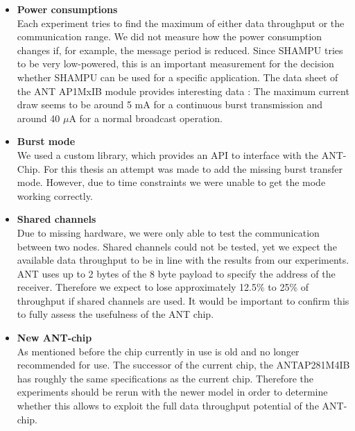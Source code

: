 \begin{itemize}
	\item{\textbf{Power consumptions}} \hfill \\ Each experiment tries to find the maximum of either data throughput or the communication range. We did not measure how the power consumption changes if, for example, the message period is reduced. Since SHAMPU tries to be very low-powered, this is an important measurement for the decision whether SHAMPU can be used for a specific application. The data sheet of the ANT AP1MxIB module provides interesting data \cite{Networks}: The maximum current draw seems to be around 5 mA for a continuous burst transmission and around 40 $\mu$A for a normal broadcast operation.
	
	\item{\textbf{Burst mode}} \hfill \\ We used a custom library, which provides an API to interface with the ANT-Chip. For this thesis an attempt was made to add the missing burst transfer mode. However, due to time constraints we were unable to get the mode working correctly. 
	
	\item{\textbf{Shared channels}} \hfill \\ Due to missing hardware, we were only able to test the communication between two nodes. Shared channels could not be tested, yet we expect the available data throughput to be in line with the results from our experiments. ANT uses up to 2 bytes of the 8 byte payload to specify the address of the receiver. Therefore we expect to lose approximately 12.5\% to 25\% of throughput if shared channels are used. It would be important to confirm this to fully assess the usefulness of the ANT chip.
	
	\item{\textbf{New ANT-chip}} \hfill \\ As mentioned before the chip currently in use is old and no longer recommended for use. The successor of the current chip, the ANTAP281M4IB has roughly the same specifications as the current chip. Therefore the experiments should be rerun with the newer model in order to determine whether this allows to exploit the full data throughput potential of the ANT-chip.
\end{itemize}
